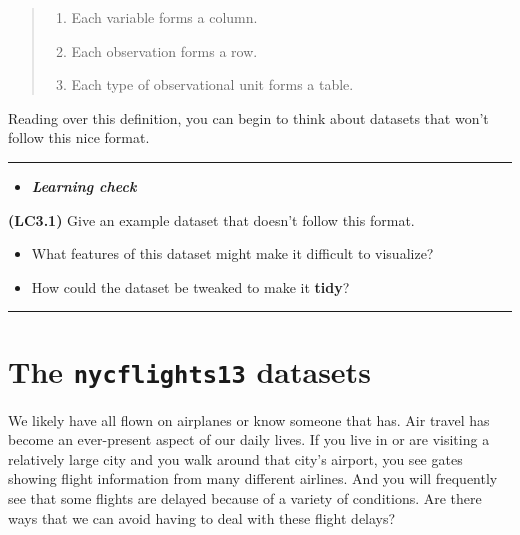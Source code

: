 \documentclass[]{tufte-book}
\providecommand{\tightlist}{%
  \setlength{\itemsep}{0pt}\setlength{\parskip}{0pt}}
\newenvironment{rmdblock}[1]
  {\begin{shaded*}
  \begin{itemize}
  \renewcommand{\labelitemi}{
    \raisebox{-.7\height}[0pt][0pt]{
    }
  }
  \item
  }
  {
  \end{itemize}
  \end{shaded*}
  }
\newenvironment{learncheck}
  {\begin{rmdblock}{warning}}
  {\end{rmdblock}}
\begin{document}
\begin{quote}
\begin{enumerate}
\def\labelenumi{\arabic{enumi}.}
\tightlist
\item
  Each variable forms a column.
\item
  Each observation forms a row.
\item
  Each type of observational unit forms a table.
\end{enumerate}
\end{quote}

Reading over this definition, you can begin to think about datasets that
won't follow this nice format.

\begin{center}\rule{0.5\linewidth}{\linethickness}\end{center}

\begin{learncheck}
\textbf{\emph{Learning check}}
\end{learncheck}

\textbf{(LC3.1)} Give an example dataset that doesn't follow this
format.

\begin{itemize}
\tightlist
\item
  What features of this dataset might make it difficult to visualize?\\
\item
  How could the dataset be tweaked to make it \textbf{tidy}?
\end{itemize}

\begin{center}\rule{0.5\linewidth}{\linethickness}\end{center}

\section{\texorpdfstring{The \texttt{nycflights13}
datasets}{The nycflights13 datasets}}\label{the-nycflights13-datasets}

We likely have all flown on airplanes or know someone that has. Air
travel has become an ever-present aspect of our daily lives. If you live
in or are visiting a relatively large city and you walk around that
city's airport, you see gates showing flight information from many
different airlines. And you will frequently see that some flights are
delayed because of a variety of conditions. Are there ways that we can
avoid having to deal with these flight delays?
\end{document}
